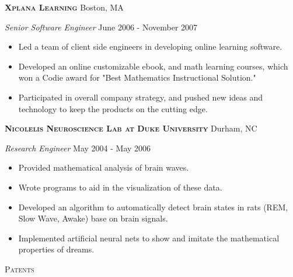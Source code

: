 \documentclass[a4paper]{article}
\newcommand{\lineunder} {
    \vspace*{-8pt} \\
    \hspace*{-18pt} \hrulefill \\
}
\newcommand{\header} [1] {
    {\hspace*{-18pt}\vspace*{6pt} \textsc{#1}}
    \vspace*{-6pt} \lineunder
    \vspace{2mm}
}
\begin{document}
\textbf{\textsc{Xplana Learning}} \hfill Boston, MA\\
\vspace{2mm}

\begin{addmargin}[1em]{0em}

\textit{Senior Software Engineer} \hfill June 2006 - November 2007\\
\vspace{-1mm}
\begin{itemize} \itemsep 1pt
    \item Led a team of client side engineers in developing online learning software.
    \item Developed an online customizable ebook, and math learning courses, which 
        won a Codie award for "Best Mathematics Instructional Solution."
    \item Participated in overall company strategy, and pushed new ideas and technology 
        to keep the products on the cutting edge.
\end{itemize}

\end{addmargin}

\textbf{\textsc{Nicolelis Neuroscience Lab at Duke University}} \hfill Durham, NC\\
\vspace{2mm}

\begin{addmargin}[1em]{0em}

\textit{Research Engineer} \hfill May 2004 - May 2006\\
\vspace{-1mm}
\begin{itemize} \itemsep 1pt
    \item Provided mathematical analysis of brain waves.
    \item Wrote programs to aid in the visualization of these data.
    \item Developed an algorithm to automatically detect brain states 
        in rats (REM, Slow Wave, Awake) base on brain signals.
    \item Implemented artificial neural nets to show and imitate the 
        mathematical properties of dreams.

\end{itemize}

\end{addmargin}

\header{Patents}
\end{document}
